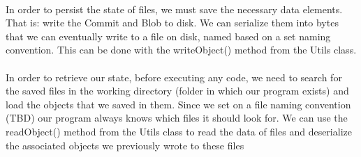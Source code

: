 \documentclass[10pt]{article}
\begin{document}
\paragraph{} In order to persist the state of files, we must save the necessary data elements. That is: write the Commit and Blob to disk. We can serialize them into bytes that we can eventually write to a file on disk, named based on a set naming convention. This can be done with the writeObject() method from the Utils class.

\paragraph{} In order to retrieve our state, before executing any code, we need to search for the saved files in the working directory (folder in which our program exists) and load the objects that we saved in them. Since we set on a file naming convention (TBD) our program always knows which files it should look for. We can use the readObject() method from the Utils class to read the data of files and deserialize the associated objects we previously wrote to these files
\end{document}

